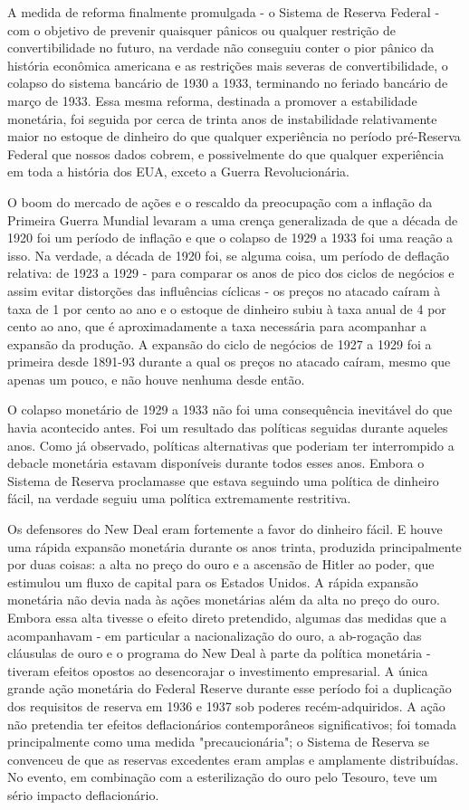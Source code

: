\documentclass[12pt]{article}
\begin{document}
A medida de reforma finalmente promulgada - o Sistema de Reserva Federal - com o objetivo de prevenir quaisquer pânicos ou qualquer restrição de convertibilidade no futuro, na verdade não conseguiu conter o pior pânico da história econômica americana e as restrições mais severas de convertibilidade, o colapso do sistema bancário de 1930 a 1933, terminando no feriado bancário de março de 1933. Essa mesma reforma, destinada a promover a estabilidade monetária, foi seguida por cerca de trinta anos de instabilidade relativamente maior no estoque de dinheiro do que qualquer experiência no período pré-Reserva Federal que nossos dados cobrem, e possivelmente do que qualquer experiência em toda a história dos EUA, exceto a Guerra Revolucionária.

O boom do mercado de ações e o rescaldo da preocupação com a inflação da Primeira Guerra Mundial levaram a uma crença generalizada de que a década de 1920 foi um período de inflação e que o colapso de 1929 a 1933 foi uma reação a isso. Na verdade, a década de 1920 foi, se alguma coisa, um período de deflação relativa: de 1923 a 1929 - para comparar os anos de pico dos ciclos de negócios e assim evitar distorções das influências cíclicas - os preços no atacado caíram à taxa de 1 por cento ao ano e o estoque de dinheiro subiu à taxa anual de 4 por cento ao ano, que é aproximadamente a taxa necessária para acompanhar a expansão da produção. A expansão do ciclo de negócios de 1927 a 1929 foi a primeira desde 1891-93 durante a qual os preços no atacado caíram, mesmo que apenas um pouco, e não houve nenhuma desde então.

O colapso monetário de 1929 a 1933 não foi uma consequência inevitável do que havia acontecido antes. Foi um resultado das políticas seguidas durante aqueles anos. Como já observado, políticas alternativas que poderiam ter interrompido a debacle monetária estavam disponíveis durante todos esses anos. Embora o Sistema de Reserva proclamasse que estava seguindo uma política de dinheiro fácil, na verdade seguiu uma política extremamente restritiva.

Os defensores do New Deal eram fortemente a favor do dinheiro fácil. E houve uma rápida expansão monetária durante os anos trinta, produzida principalmente por duas coisas: a alta no preço do ouro e a ascensão de Hitler ao poder, que estimulou um fluxo de capital para os Estados Unidos. A rápida expansão monetária não devia nada às ações monetárias além da alta no preço do ouro. Embora essa alta tivesse o efeito direto pretendido, algumas das medidas que a acompanhavam - em particular a nacionalização do ouro, a ab-rogação das cláusulas de ouro e o programa do New Deal à parte da política monetária - tiveram efeitos opostos ao desencorajar o investimento empresarial. A única grande ação monetária do Federal Reserve durante esse período foi a duplicação dos requisitos de reserva em 1936 e 1937 sob poderes recém-adquiridos. A ação não pretendia ter efeitos deflacionários contemporâneos significativos; foi tomada principalmente como uma medida "precaucionária"; o Sistema de Reserva se convenceu de que as reservas excedentes eram amplas e amplamente distribuídas. No evento, em combinação com a esterilização do ouro pelo Tesouro, teve um sério impacto deflacionário.
\end{document}
